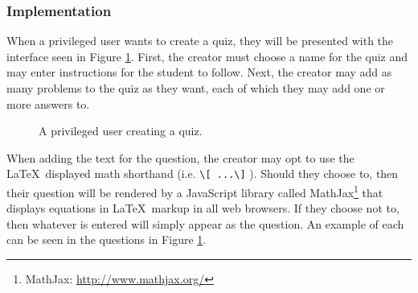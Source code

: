 \subsubsection{Implementation}
When a privileged user wants to create a quiz, they will be presented with the interface seen in Figure \ref{fig:screens-quiz-new}. First, the creator must choose a name for the quiz and may enter instructions for the student to follow. Next, the creator may add as many problems to the quiz as they want, each of which they may add one or more answers to.

\begin{figure}[p!]
	\centering
	\caption{A privileged user creating a quiz.}
	\label{fig:screens-quiz-new}
\end{figure}

When adding the text for the question, the creator may opt to use the \LaTeX\ displayed math shorthand (i.e. \texttt{\textbackslash [ ...\textbackslash ]} ). Should they choose to, then their question will be rendered by a JavaScript library called MathJax\footnote{MathJax: \url{http://www.mathjax.org/}} that displays equations in \LaTeX\ markup in all web browsers. If they choose not to, then whatever is entered will simply appear as the question. An example of each can be seen in the questions in Figure \ref{fig:screens-quiz-new}.


